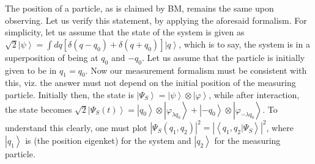 The position of a particle, as is claimed by BM, remains the same
upon observing. Let us verify this statement, by applying the aforesaid
formalism. For simplicity, let us assume that the state of the system
is given as $\sqrt{2}\left|\psi\right\rangle =\int dq\left[\delta(q-q_{0})+\delta(q+q_{0})\right]\left|q\right\rangle $,
which is to say, the system is in a superposition of being at $q_{0}$
and $-q_{0}$. Let us assume that the particle is initially given
to be in $q_{1}=q_{0}$. Now our measurement formalism must be consistent
with this, viz. the answer must not depend on the initial position
of the measuring particle. Initially then, the state is $\left|\Psi_{S}\right\rangle =\left|\psi\right\rangle \otimes\left|\varphi\right\rangle $,
while after interaction, the state becomes $\sqrt{2}\left|\Psi_{S}(t)\right\rangle =\left|q_{0}\right\rangle \otimes\left|\varphi_{\lambda q_{0}}\right\rangle +\left|-q_{0}\right\rangle \otimes\left|\varphi_{-\lambda q_{0}}\right\rangle $.
To understand this clearly, one must plot $\left|\Psi_{S}(q_{1},q_{2})\right|^{2}=\left|\left\langle q_{1},q_{2}|\Psi_{S}\right\rangle \right|^{2}$,
where $\left|q_{1}\right\rangle $ is (the position eigenket) for
the system and $\left|q_{2}\right\rangle $ for the measuring particle.
